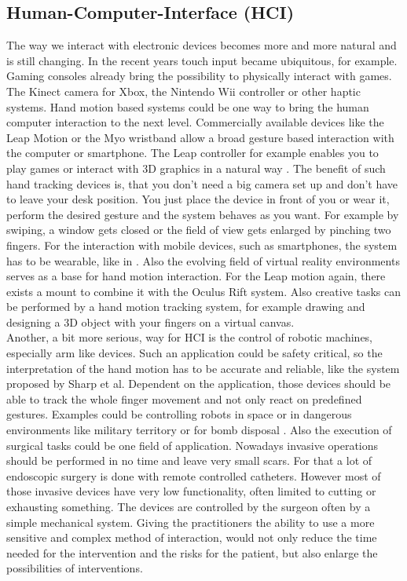 \subsection{Human-Computer-Interface (HCI)} \label{subsec:applications:HCI}
The way we interact with electronic devices becomes more and more natural and is still changing. In the recent years touch input became ubiquitous, for example. Gaming consoles already bring the possibility to physically interact with games. The Kinect camera for Xbox, the Nintendo Wii controller or other haptic systems. Hand motion based systems could be one way to bring the human computer interaction to the next level. Commercially available devices like the Leap Motion or the Myo wristband allow a broad gesture based interaction with the computer or smartphone. The Leap controller for example enables you to play games or interact with 3D graphics in a natural way \cite{leap}. The benefit of such hand tracking devices is, that you don't need a big camera set up and don't have to leave your desk position. You just place the device in front of you or wear it, perform the desired gesture and the system behaves as you want. For example by swiping, a window gets closed or the field of view gets enlarged by pinching two fingers. For the interaction with mobile devices, such as smartphones, the system has to be wearable, like in \cite{Digits}. Also the evolving field of virtual reality environments serves as a base for hand motion interaction. For the Leap motion again, there exists a mount to combine it with the Oculus Rift system. Also creative tasks can be performed by a hand motion tracking system, for example drawing and designing a 3D object with your fingers on a virtual canvas.\\
Another, a bit more serious, way for HCI is the control of robotic machines, especially arm like devices. Such an application could be safety critical, so the interpretation of the hand motion has to be accurate and reliable, like the system proposed by Sharp et al. Dependent on the application, those devices should be able to track the whole finger movement and not only react on predefined gestures. Examples could be controlling robots in space \cite{dipietro2008survey} or in dangerous environments like military territory or for bomb disposal \cite{greenleaf1996developing}. Also the execution of surgical tasks could be one field of application. Nowadays invasive operations should be performed in no time and leave very small scars. For that a lot of endoscopic surgery is done with remote controlled catheters. However most of those invasive devices have very low functionality, often limited to cutting or exhausting something. The devices are controlled by the surgeon often by a simple mechanical system. Giving the practitioners the ability to use a more sensitive and complex method of interaction, would not only reduce the time needed for the intervention and the risks for the patient, but also enlarge the possibilities of interventions.\\

